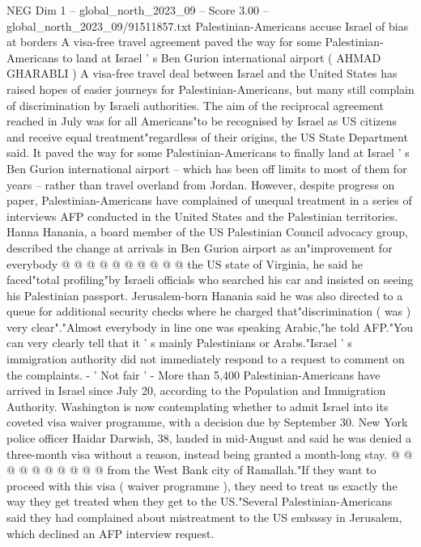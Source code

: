 \begin{textsample}{NEG Dim 1 – global\_north\_2023\_09 – Score 3.00 – global\_north\_2023\_09/91511857.txt}  \label{ex:f1_neg_345}
Palestinian-Americans accuse Israel of bias at borders A visa-free travel agreement paved the way for some Palestinian-Americans to land at Israel ' s Ben Gurion international airport ( AHMAD GHARABLI ) A visa-free travel deal between Israel and the United States has raised hopes of easier journeys for Palestinian-Americans, but many still complain of discrimination by Israeli authorities.
The aim of the reciprocal agreement reached in July was for all Americans"to be recognised by Israel as US citizens and receive equal treatment"regardless of their origins, the US State Department said.
It paved the way for some Palestinian-Americans to finally land at Israel ' s Ben Gurion international airport -- which has been off limits to most of them for years -- rather than travel overland from Jordan.
However, despite progress on paper, Palestinian-Americans have complained of unequal treatment in a series of interviews AFP conducted in the United States and the Palestinian territories.
Hanna Hanania, a board member of the US Palestinian Council advocacy group, described the change at arrivals in Ben Gurion airport as an"improvement for everybody @ @ @ @ @ @ @ @ @ @ the US state of Virginia, he said he faced"total profiling"by Israeli officials who searched his car and insisted on seeing his Palestinian passport.
Jerusalem-born Hanania said he was also directed to a queue for additional security checks where he charged that"discrimination ( was ) very clear"."Almost everybody in line one was speaking Arabic,"he told AFP."You can very clearly tell that it ' s mainly Palestinians or Arabs."Israel ' s immigration authority did not immediately respond to a request to comment on the complaints. - ' Not fair ' - More than 5,400 Palestinian-Americans have arrived in Israel since July 20, according to the Population and Immigration Authority.
Washington is now contemplating whether to admit Israel into its coveted visa waiver programme, with a decision due by September 30.
New York police officer Haidar Darwish, 38, landed in mid-August and said he was denied a three-month visa without a reason, instead being granted a month-long stay. @ @ @ @ @ @ @ @ @ @ from the West Bank city of Ramallah."If they want to proceed with this visa ( waiver programme ), they need to treat us exactly the way they get treated when they get to the US."Several Palestinian-Americans said they had complained about mistreatment to the US embassy in Jerusalem, which declined an AFP interview request.

\end{textsample}
